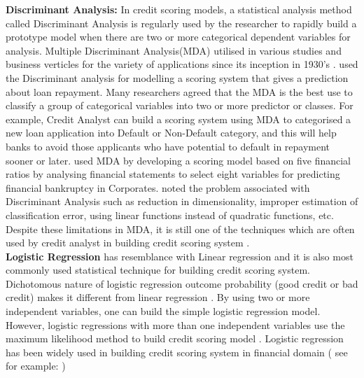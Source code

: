 {\textbf{Discriminant Analysis:} In credit scoring models,  a statistical analysis method called Discriminant Analysis is regularly used by the researcher to rapidly build a prototype model when there are two or more categorical dependent variables for analysis. Multiple Discriminant Analysis(MDA) utilised in various studies and business verticles for the variety of applications since its inception in 1930's \citep{fisher1936use}. \citet{durand1941risk} used the Discriminant analysis for modelling a scoring system that gives a prediction about loan repayment. Many researchers agreed that the MDA is the best use to classify a group of categorical variables into two or more predictor or classes. For example, Credit Analyst can build a scoring system using MDA to categorised a new loan application into Default or Non-Default category, and this will help banks to avoid those applicants who have potential to default in repayment sooner or later. \citet{altman1968financial} used MDA by developing a scoring model based on five financial ratios by analysing financial statements to select eight variables for predicting financial bankruptcy in Corporates. \citet{eisenbeis1978problems} noted the problem associated with Discriminant Analysis such as reduction in dimensionality, improper estimation of classification error, using linear functions instead of quadratic functions, etc. Despite these limitations in MDA, it is still one of the techniques which are often used by credit analyst in building credit scoring system \citep{zhou2016research,liberati2017advances}.\\


\textbf{Logistic Regression}\label{logit} has resemblance with Linear regression and it is also most commonly used statistical technique for building credit scoring system. Dichotomous nature of logistic regression outcome probability (good credit or bad credit) makes it different from linear regression \citep{hosmer1989best}. By using two or more independent variables, one can build the simple logistic regression model. However, logistic regressions with more than one independent variables use the maximum likelihood method to build credit scoring model \citep{altland1999regression}. Logistic regression has been widely used in building credit scoring system in financial domain ( see for example: \cite{nie2011credit,abdou2008neural,bensic2005modelling,joanes1993reject}) \\

}
